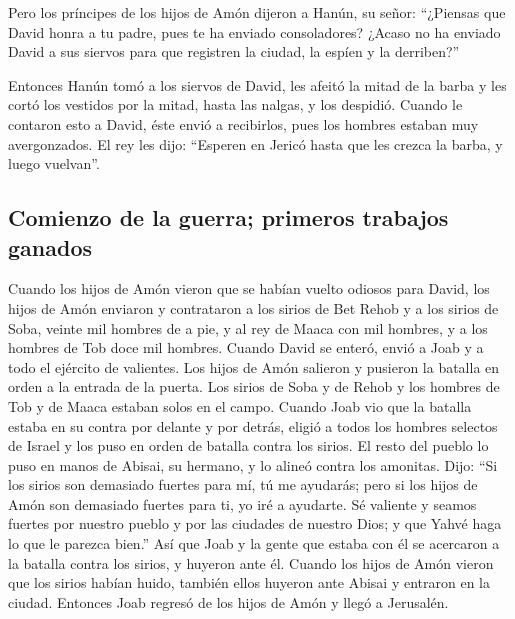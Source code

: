 \begin{paracol}{2}
 Pero los príncipes de los hijos de Amón dijeron a Hanún,
su señor: ``¿Piensas que David honra a tu padre, pues te ha enviado
consoladores? ¿Acaso no ha enviado David a sus siervos para que
registren la ciudad, la espíen y la derriben?''

 Entonces Hanún tomó a los siervos de David, les afeitó la
mitad de la barba y les cortó los vestidos por la mitad, hasta las
nalgas, y los despidió.  Cuando le contaron esto a David,
éste envió a recibirlos, pues los hombres estaban muy avergonzados. El
rey les dijo: ``Esperen en Jericó hasta que les crezca la barba, y luego
vuelvan''.

\hypertarget{comienzo-de-la-guerra-primeros-trabajos-ganados}{%
\subsection{Comienzo de la guerra; primeros trabajos
ganados}\label{comienzo-de-la-guerra-primeros-trabajos-ganados}}

 Cuando los hijos de Amón vieron que se habían vuelto
odiosos para David, los hijos de Amón enviaron y contrataron a los
sirios de Bet Rehob y a los sirios de Soba, veinte mil hombres de a pie,
y al rey de Maaca con mil hombres, y a los hombres de Tob doce mil
hombres.  Cuando David se enteró, envió a Joab y a todo el
ejército de valientes.  Los hijos de Amón salieron y
pusieron la batalla en orden a la entrada de la puerta. Los sirios de
Soba y de Rehob y los hombres de Tob y de Maaca estaban solos en el
campo.  Cuando Joab vio que la batalla estaba en su contra
por delante y por detrás, eligió a todos los hombres selectos de Israel
y los puso en orden de batalla contra los sirios.  El
resto del pueblo lo puso en manos de Abisai, su hermano, y lo alineó
contra los amonitas.  Dijo: ``Si los sirios son demasiado
fuertes para mí, tú me ayudarás; pero si los hijos de Amón son demasiado
fuertes para ti, yo iré a ayudarte.  Sé valiente y seamos
fuertes por nuestro pueblo y por las ciudades de nuestro Dios; y que
Yahvé haga lo que le parezca bien.''  Así que Joab y la
gente que estaba con él se acercaron a la batalla contra los sirios, y
huyeron ante él.  Cuando los hijos de Amón vieron que los
sirios habían huido, también ellos huyeron ante Abisai y entraron en la
ciudad. Entonces Joab regresó de los hijos de Amón y llegó a Jerusalén.


\end{paracol}

